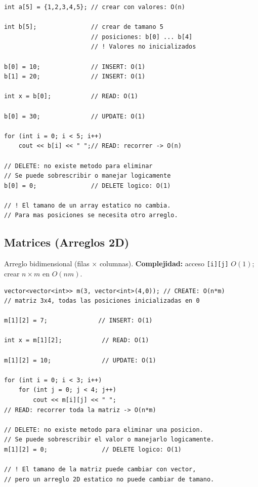 \documentclass[10pt,a4paper,twocolumn]{article}
\begin{document}
\begin{lstlisting}[style=cpp]
int a[5] = {1,2,3,4,5}; // crear con valores: O(n)

int b[5];               // crear de tamano 5
                        // posiciones: b[0] ... b[4]
                        // ! Valores no inicializados

b[0] = 10;              // INSERT: O(1)
b[1] = 20;              // INSERT: O(1)

int x = b[0];           // READ: O(1)

b[0] = 30;              // UPDATE: O(1)

for (int i = 0; i < 5; i++)
    cout << b[i] << " ";// READ: recorrer -> O(n)

// DELETE: no existe metodo para eliminar
// Se puede sobrescribir o manejar logicamente
b[0] = 0;               // DELETE logico: O(1)

// ! El tamano de un array estatico no cambia.
// Para mas posiciones se necesita otro arreglo.
\end{lstlisting}

\subsection{Matrices (Arreglos 2D)}

Arreglo bidimensional (filas $\times$ columnas). \textbf{Complejidad:}
acceso \texttt{[i][j]} $O(1)$; crear $n\times m$ en $O(nm)$.

\begin{lstlisting}[style=cpp]
vector<vector<int>> m(3, vector<int>(4,0)); // CREATE: O(n*m)
// matriz 3x4, todas las posiciones inicializadas en 0

m[1][2] = 7;              // INSERT: O(1)

int x = m[1][2];           // READ: O(1)

m[1][2] = 10;              // UPDATE: O(1)

for (int i = 0; i < 3; i++)
    for (int j = 0; j < 4; j++)
        cout << m[i][j] << " ";
// READ: recorrer toda la matriz -> O(n*m)

// DELETE: no existe metodo para eliminar una posicion.
// Se puede sobrescribir el valor o manejarlo logicamente.
m[1][2] = 0;               // DELETE logico: O(1)

// ! El tamano de la matriz puede cambiar con vector,
// pero un arreglo 2D estatico no puede cambiar de tamano.
\end{lstlisting}
\end{document}
